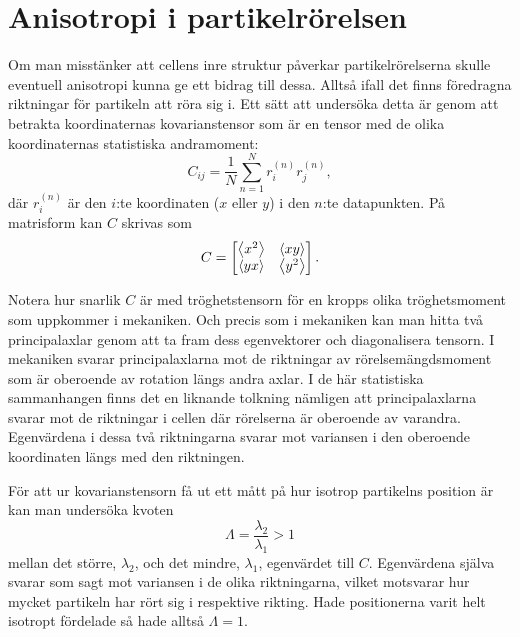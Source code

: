 \section{Anisotropi i partikelrörelsen}
Om man misstänker att cellens inre struktur påverkar partikelrörelserna skulle eventuell anisotropi kunna ge ett bidrag till dessa. Alltså ifall det finns föredragna riktningar för partikeln att röra sig i. Ett sätt att undersöka detta är genom att betrakta koordinaternas kovarianstensor som är en tensor med de olika koordinaternas statistiska andramoment:
\begin{equation}
C_{ij} = \frac{1}{N} \sum_{n=1}^{N} r_i^{(n)}r_j^{(n)},
\end{equation}
där $r_i^{(n)}$ är den $i$:te koordinaten ($x$ eller $y$) i den $n$:te datapunkten. På matrisform kan $C$ skrivas som
\begin{equation}
C=
\begin{bmatrix} \label{eq:C_matrix}
\ev{x^2} & \ev{xy}\\
\ev{yx} & \ev{y^2}
\end{bmatrix}.
\end{equation}

Notera hur snarlik $C$ är med tröghetstensorn för en kropps olika tröghetsmoment som uppkommer i mekaniken. Och precis som i mekaniken kan man hitta två principalaxlar genom att ta fram dess egenvektorer och diagonalisera tensorn. I mekaniken svarar principalaxlarna mot de riktningar av rörelsemängdsmoment som är oberoende av rotation längs andra axlar. I de här statistiska sammanhangen finns det en liknande tolkning nämligen att principalaxlarna svarar mot de riktningar i cellen där rörelserna är oberoende av varandra. Egenvärdena i dessa två riktningarna svarar mot variansen i den oberoende koordinaten längs med den riktningen.

För att ur kovarianstensorn få ut ett mått på hur isotrop partikelns position är kan man undersöka kvoten
\begin{equation}
\varLambda = \frac{\lambda_2}{\lambda_1} >1
\end{equation} 
mellan det större, $\lambda_2$, och det mindre, $\lambda_1$,  egenvärdet till $C$. Egenvärdena själva svarar som sagt mot variansen i de olika riktningarna, vilket motsvarar hur mycket partikeln har rört sig i respektive rikting. Hade positionerna varit helt isotropt fördelade så hade alltså $\varLambda=1$. 

